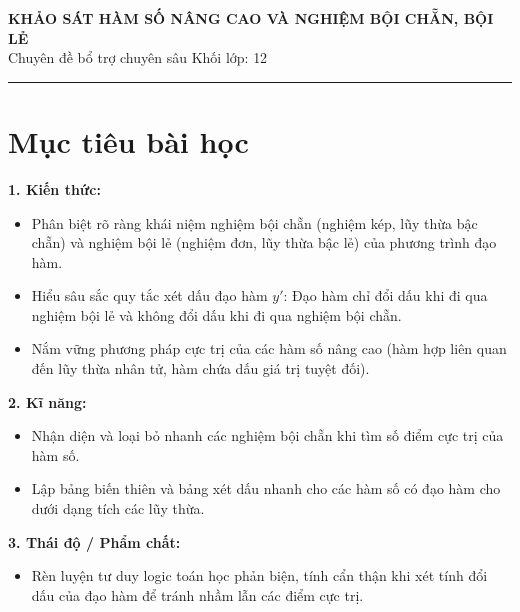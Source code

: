 \documentclass[12pt]{article}
\begin{document}
	
	\begin{center}
		{\LARGE \textbf{KHẢO SÁT HÀM SỐ NÂNG CAO VÀ NGHIỆM BỘI CHẴN, BỘI LẺ}}\\[6pt]
		{\large Chuyên đề bổ trợ chuyên sâu \quad Khối lớp: 12}
	\end{center}
	\vspace{4mm}
	\hrule
	\vspace{4mm}
	
	\section*{Mục tiêu bài học}
	
	\textbf{1. Kiến thức:}
	\begin{itemize}
		\item Phân biệt rõ ràng khái niệm nghiệm bội chẵn (nghiệm kép, lũy thừa bậc chẵn) và nghiệm bội lẻ (nghiệm đơn, lũy thừa bậc lẻ) của phương trình đạo hàm.
		\item Hiểu sâu sắc quy tắc xét dấu đạo hàm $y'$: Đạo hàm chỉ đổi dấu khi đi qua nghiệm bội lẻ và không đổi dấu khi đi qua nghiệm bội chẵn.
		\item Nắm vững phương pháp cực trị của các hàm số nâng cao (hàm hợp liên quan đến lũy thừa nhân tử, hàm chứa dấu giá trị tuyệt đối).
	\end{itemize}
	
	\textbf{2. Kĩ năng:}
	\begin{itemize}
		\item Nhận diện và loại bỏ nhanh các nghiệm bội chẵn khi tìm số điểm cực trị của hàm số.
		\item Lập bảng biến thiên và bảng xét dấu nhanh cho các hàm số có đạo hàm cho dưới dạng tích các lũy thừa.
	\end{itemize}
	
	\textbf{3. Thái độ / Phẩm chất:}
	\begin{itemize}
		\item Rèn luyện tư duy logic toán học phản biện, tính cẩn thận khi xét tính đổi dấu của đạo hàm để tránh nhầm lẫn các điểm cực trị.
	\end{itemize}
	
	\newpage
	
	\setcounter{tocdepth}{2}
	\tableofcontents
	\newpage
	
\end{document}
